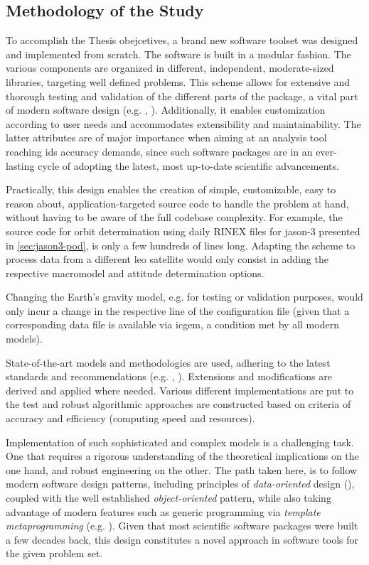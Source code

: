 \subsection{Methodology of the Study}\label{ssec:methodology}

To accomplish the Thesis obejcetives, a brand new software toolset was designed and 
implemented from scratch. The software is built in a modular fashion. The various components
are organized in different, independent, moderate-sized libraries, targeting well defined
problems. This scheme allows for extensive and thorough testing and validation  of the different 
parts of the package, a vital part of modern software design (e.g. \cite{Oberkampf2010}, \cite{Meyer2008}).
Additionally, it enables customization according to user needs and accommodates  
extensibility and maintainability. The latter attributes are of major importance when 
aiming at an analysis tool reaching \gls{ids} accuracy demands, since such software packages 
are in an ever-lasting cycle of adopting the latest, most up-to-date scientific advancements.

Practically, this design enables the creation of simple, customizable, easy to 
reason about, application-targeted source code to handle the problem at hand, without 
having to be aware of the full codebase complexity. For example, the source code 
for orbit determination using daily RINEX files for \gls{jason}-3 presented in 
\autoref{sec:jason3-pod}, is only a few hundreds of lines long. Adapting the scheme 
to process data from a different \gls{leo} satellite would only consist in adding 
the respective macromodel and attitude determination options.

Changing the Earth's gravity model, e.g. for testing or validation purposes, 
would only incur a change in the respective line of the configuration file (given 
that a corresponding data file is available via \gls{icgem}, a condition met 
by all modern models).

State-of-the-art models and methodologies are used, adhering to the latest 
standards and recommendations (e.g. \cite{IdsRecommendationItrf2020}, \cite{iers2010}). 
Extensions and modifications are derived and applied where needed. Various different 
implementations are put to the test and robust algorithmic approaches are constructed 
based on criteria of accuracy and efficiency (computing speed and resources).

Implementation of such sophisticated and complex models is a challenging task. One that requires a 
rigorous understanding of the theoretical implications on the one hand, and robust 
engineering on the other. The path taken here, is to follow modern software design 
patterns, including principles of \emph{data-oriented} design (\cite{Fabian2018}), coupled with 
the well established \emph{object-oriented} pattern, while also taking advantage of 
modern features such as generic programming via \emph{template metaprogramming} 
(e.g. \cite{Gawlik2018}). Given that most scientific software packages were built 
a few decades back, this design constitutes a novel approach in software tools for 
the given problem set.

